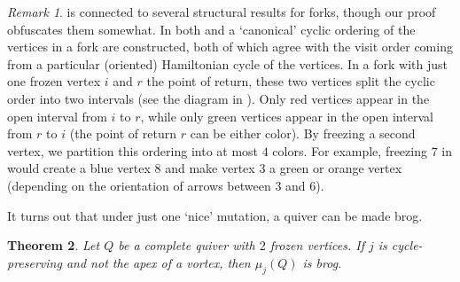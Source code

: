 \documentclass[12pt]{amsart}
\newtheorem{thm}{Theorem}[section]
\theoremstyle{definition}
\theoremstyle{remark}
\newtheorem{rem}[thm]{Remark}
\numberwithin{equation}{section}
\begin{document}
\begin{rem}
\label{rem: ice forks and coloring}
 is connected to several structural results for forks, though our proof obfuscates them somewhat. 
In both \cite[Proposition 15.10]{COQ} and \cite[Lemma 5.1, Corollary 5.2]{EJLN} a `canonical' cyclic ordering of the vertices in a fork are constructed, both of which agree with the visit order coming from a particular (oriented) Hamiltonian cycle of the vertices. 
In a fork with just one frozen vertex $i$ and $r$ the point of return, these two vertices split the cyclic order into two intervals (see the diagram in ).
Only red vertices appear in the open interval from $i$ to $r$, while only green vertices appear in the open interval from $r$ to $i$ (the point of return $r$ can be either color). 
By freezing a second vertex, we partition this ordering into at most $4$ colors. For example, freezing $7$ in  would create a blue vertex $8$ and make vertex $3$ a green or orange vertex (depending on the orientation of arrows between $3$ and $6$).
\end{rem}

It turns out that under just one `nice' mutation, a quiver can be made brog.  

\begin{thm}\label{thm: brog}
Let $Q$ be a complete quiver with $2$ frozen vertices.  If $j$ is cycle-preserving and not the apex of a vortex, then $\mu_j(Q)$ is brog. 
\end{thm}
\end{document}
